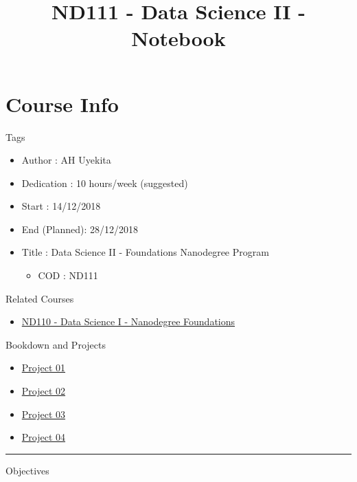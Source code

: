 \documentclass[]{book}
\title{ND111 - Data Science II - Notebook}
\author{}
\date{}
\providecommand{\tightlist}{%
  \setlength{\itemsep}{0pt}\setlength{\parskip}{0pt}}
\begin{document}
\maketitle

{
\setcounter{tocdepth}{1}
\tableofcontents
}
\chapter*{Course Info}\label{course-info}

Tags

\begin{itemize}
\tightlist
\item
  Author : AH Uyekita
\item
  Dedication : 10 hours/week (suggested)
\item
  Start : 14/12/2018
\item
  End (Planned): 28/12/2018
\item
  Title : Data Science II - Foundations Nanodegree Program

  \begin{itemize}
  \tightlist
  \item
    COD : ND111
  \end{itemize}
\end{itemize}

Related Courses

\begin{itemize}
\tightlist
\item
  \href{https://github.com/AndersonUyekita/ND110_data_science_foundations_01}{ND110
  - Data Science I - Nanodegree Foundations}
\end{itemize}

Bookdown and Projects

\begin{itemize}
\tightlist
\item
  \href{https://bit.ly/nd111_project_01}{Project 01}
\item
  \href{https://bit.ly/nd111_project_02}{Project 02}
\item
  \href{https://bit.ly/nd111_project_03}{Project 03}
\item
  \href{https://bit.ly/nd111_project_04}{Project 04}
\end{itemize}

\begin{center}\rule{0.5\linewidth}{\linethickness}\end{center}

Objectives
\end{document}
